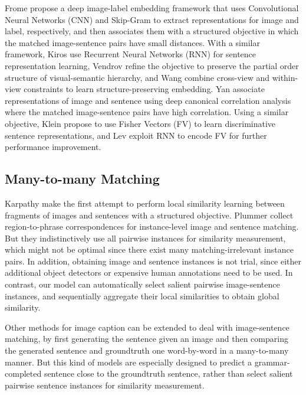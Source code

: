 \documentclass[10pt,twocolumn,letterpaper]{article}
\begin{document}
Frome \etal \cite{frome2013devise} propose a deep image-label embedding framework
that uses Convolutional Neural Networks (CNN) \cite{krizhevsky2012imagenet}
and Skip-Gram \cite{mikolov2013efficient} to extract representations for image and label, respectively,
and then associates them with a structured objective
in which the matched image-sentence pairs have small distances.
With a similar framework, Kiros \etal \cite{kiros2014unifying}
use Recurrent Neural Networks (RNN) \cite{hochreiter1997long} for sentence representation learning,
Vendrov \etal \cite{vendrov2015order} refine the objective
to preserve the partial order structure of visual-semantic hierarchy,
and Wang \etal \cite{wang2015learning} combine cross-view and within-view constraints
to learn structure-preserving embedding.
Yan \etal \cite{yan2015deep} associate representations of image and sentence
using deep canonical correlation analysis
where the matched image-sentence pairs have high correlation.
Using a similar objective, Klein \etal \cite{klein2015associating}
propose to use Fisher Vectors (FV) \cite{perronnin2007fisher}
to learn discriminative sentence representations,
and Lev \etal \cite{lev2015rnn} exploit RNN to encode FV for
further performance improvement.




\subsection{Many-to-many Matching}



Karpathy \etal \cite{karpathy2014vsa,karpathy2014deep} make the first attempt
to perform local similarity learning between
fragments of images and sentences with a structured objective.
Plummer \etal \cite{plummer2015flickr30k} collect region-to-phrase correspondences
for instance-level image and sentence matching.
But they indistinctively use all pairwise instances for similarity measurement,
which might not be optimal since there exist many matching-irrelevant instance pairs.
In addition, obtaining image and sentence instances is not trial,
since either additional object detectors or expensive human annotations
need to be used.
In contrast, our model can automatically select
salient pairwise image-sentence instances,
and sequentially aggregate their local similarities to obtain global similarity.

Other methods for image caption
\cite{mao2014explain,fang2015captions,donahue2015long,vinyals2015show,chen2015mind}
can be extended to deal with image-sentence matching,
by first generating the sentence given an image and then
comparing the generated sentence and groundtruth one word-by-word in a many-to-many manner.
But this kind of models are especially designed to
predict a grammar-completed sentence close to the groundtruth sentence,
rather than select salient pairwise sentence instances for similarity measurement.
\end{document}
